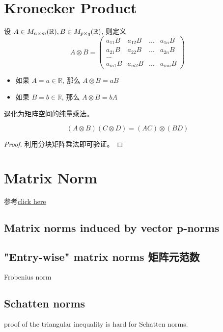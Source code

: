 \documentclass[11pt,fleqn]{book} %
\def\R{\mathbb{R}}
\begin{document}
\begin{CJK}{UTF8}{gkai}
\section{Kronecker Product}
\begin{definition}
    设 $A \in M_{n \x m }(\R), B \in M_{p \x q}(\R)$, 则定义
    \[
        A \otimes B = 
        \begin{pmatrix}
            a_{11}B & a_{12}B & ... & a_{1n}B \\
            a_{21}B & a_{22}B & ... & a_{2n}B \\
            ... \\
            a_{m1}B & a_{m2}B & ... & a_{mn}B 
        \end{pmatrix}\]
\end{definition}
\begin{remark}
    \begin{itemize}
        \item 如果 $A = a\in \R$, 那么 $A \otimes B = aB$ 
        \item 如果 $B = b \in \R$, 那么 $A \otimes B = bA$ 
    \end{itemize}
    退化为矩阵空间的纯量乘法。
\end{remark}

\begin{property}
    [混合乘积] \[
        (A\otimes B)(C \otimes D) = (AC) \otimes (BD)\]
\end{property}
\begin{proof}
    利用分块矩阵乘法即可验证。
\end{proof}

\section{Matrix Norm}
参考\href{https://en.wikipedia.org/wiki/Matrix_norm}{click here}
\subsection{Matrix norms induced by vector p-norms}
\subsection{"Entry-wise" matrix norms 矩阵元范数}
Frobenius norm

\subsection{Schatten norms}
proof of the triangular inequality is hard for Schatten norms.


\end{CJK}
\end{document}
